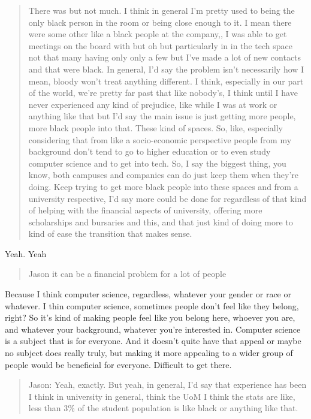 \documentclass[
]{book}
\begin{document}
\begin{quote}
There was but not much. I think in general I'm pretty used to being the only black person in the room or being close enough to it. I mean there were some other like a black people at the company,, I was able to get meetings on the board with but oh but particularly in in the tech space not that many having only only a few but I've made a lot of new contacts and that were black. In general, I'd say the problem isn't necessarily how I mean, bloody won't treat anything different. I think, especially in our part of the world, we're pretty far past that like nobody's, I think until I have never experienced any kind of prejudice, like while I was at work or anything like that but I'd say the main issue is just getting more people, more black people into that. These kind of spaces. So, like, especially considering that from like a socio-economic perspective people from my background don't tend to go to higher education or to even study computer science and to get into tech. So, I say the biggest thing, you know, both campuses and companies can do just keep them when they're doing. Keep trying to get more black people into these spaces and from a university respective, I'd say more could be done for regardless of that kind of helping with the financial aspects of university, offering more scholarships and bursaries and this, and that just kind of doing more to kind of ease the transition that makes sense.
\end{quote}

Yeah. Yeah

\begin{quote}
Jason it can be a financial problem for a lot of people
\end{quote}

Because I think computer science, regardless, whatever your gender or race or whatever. I thin computer science, sometimes people don't feel like they belong, right? So it's kind of making people feel like you belong here, whoever you are, and whatever your background, whatever you're interested in. Computer science is a subject that is for everyone. And it doesn't quite have that appeal or maybe no subject does really truly, but making it more appealing to a wider group of people would be beneficial for everyone. Difficult to get there.

\begin{quote}
Jason: Yeah, exactly. But yeah, in general, I'd say that experience has been I think in university in general, think the UoM I think the stats are like, less than 3\% of the student population is like black or anything like that.
\end{quote}
\end{document}
